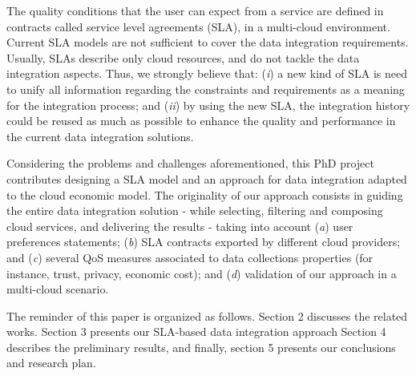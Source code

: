 The quality conditions that the user can expect from a service are defined in
contracts called service level agreements (SLA), in a multi-cloud environment.
%
Current SLA models are not sufficient to cover the data integration requirements. 
%
Usually, SLAs describe only cloud resources, and do not tackle the data integration aspects. 
%
Thus, we strongly believe that: 
(\textit{i}) a new kind of SLA is need to unify all information regarding the constraints and requirements as a meaning for the integration process; and 
(\textit{ii}) by using the new SLA, the integration history could be reused as much as possible to enhance the quality and performance in the current data integration solutions. 

Considering the problems and challenges aforementioned, this PhD project
contributes designing a SLA model and an approach for data integration adapted
to the cloud economic model. The originality of our approach consists in guiding
the entire data integration solution - while selecting, filtering and composing
cloud services, and delivering the results - taking into account (\textit{a})
user preferences statements; (\textit{b}) SLA contracts exported by different
cloud providers; and (\textit{c}) several QoS measures associated to data
collections properties (for instance, trust, privacy, economic cost); and
(\textit{d}) validation of our approach in a multi-cloud scenario.        

The reminder of this paper is organized as follows.
Section 2 discusses the related works.
Section 3 presents our SLA-based data integration approach
Section 4 describes the preliminary results, and finally, section 5 presents
our conclusions and research plan.

